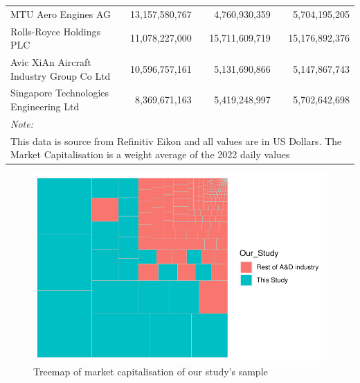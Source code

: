 \documentclass[
  number]{elsarticle}
\begin{document}
\begin{table}[H]
{\begin{tabular}[t]{lrrr}
MTU Aero Engines AG & 13,157,580,767 & 4,760,930,359 & 5,704,195,205\\
Rolls-Royce Holdings PLC & 11,078,227,000 & 15,711,609,719 & 15,176,892,376\\
Avic XiAn Aircraft Industry Group Co Ltd & 10,596,757,161 & 5,131,690,866 & 5,147,867,743\\
\addlinespace
Singapore Technologies Engineering Ltd & 8,369,671,163 & 5,419,248,997 & 5,702,642,698\\
\bottomrule
\multicolumn{4}{l}{\rule{0pt}{1em}\textit{Note: }}\\
\multicolumn{4}{l}{\rule{0pt}{1em}This data is source from Refinitiv Eikon and all values are in US Dollars.  The Market Capitalisation is a weight average of the 2022 daily values}\\
\end{tabular}}
\end{table}

\begin{figure}[H]

{\centering \includegraphics{defence_files/figure-pdf/fig-mktcapshare-1.pdf}

}

\caption{\label{fig-mktcapshare}Treemap of market capitalisation of our
study's sample}

\end{figure}


\renewcommand\refname{References}
  
\end{document}
